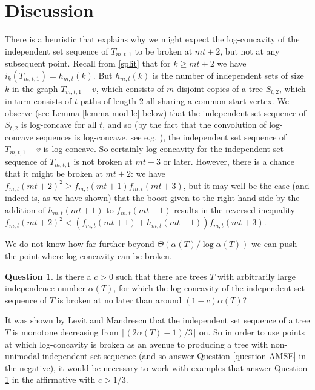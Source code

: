 \documentclass[12pt]{article}
\theoremstyle{definition}
\theoremstyle{definition}
\theoremstyle{definition}
\newtheorem{question}[thm]{Question}
\theoremstyle{definition}
\theoremstyle{definition}
\theoremstyle{definition}
\theoremstyle{definition}
\theoremstyle{definition}
\theoremstyle{remark}
\begin{document}
\section{Discussion} \label{sec-discussion}

There is a heuristic that explains why we might expect the log-concavity of the independent set sequence of $T_{m,t,1}$ to be broken at $mt+2$, but not at any subsequent point. Recall from \eqref{split} that for $k \geq mt+2$ we have $i_k(T_{m,t,1})=h_{m,t}(k)$. But $h_{m,t}(k)$ is the number of independent sets of size $k$ in the graph $T_{m,t,1}-v$, which consists of $m$ disjoint copies of a tree $S_{t,2}$, which in turn consists of $t$ paths of length $2$ all sharing a common start vertex. We observe (see Lemma \ref{lemma-mod-lc} below) that the independent set sequence of $S_{t,2}$ is log-concave for all $t$, and so (by the fact that the convolution of log-concave sequences is log-concave, see e.g. \cite{B2016}), the independent set sequence of $T_{m,t,1}-v$ is log-concave. So certainly log-concavity for the independent set sequence of $T_{m,t,1}$ is not broken at $mt+3$ or later. However, there is a chance that it might be broken at $mt+2$: we have $f_{m,t}(mt+2)^2 \geq f_{m,t}(mt+1)f_{m,t}(mt+3)$, but it may well be the case (and indeed is, as we have shown) that the boost given to the right-hand side by the addition of $h_{m,t}(mt+1)$ to $f_{m,t}(mt+1)$ results in the reversed inequality $f_{m,t}(mt+2)^2 < \left(f_{m,t}(mt+1)+h_{m,t}(mt+1)\right)f_{m,t}(mt+3)$.

\medskip

We do not know how far further beyond $\Theta\left(\alpha(T)/\log \alpha(T)\right)$ we can push the point where log-concavity can be broken.

\begin{question} \label{q-dist}
Is there a $c>0$ such that there are trees $T$ with arbitrarily large independence number $\alpha(T)$, for which the log-concavity of the independent set sequence of $T$ is broken at no later than around $(1-c)\alpha(T)$?
\end{question}
It was shown by Levit and Mandrescu \cite{LM2006} that the independent set sequence of a tree $T$ is monotone decreasing from $\lceil (2\alpha(T)-1)/3\rceil$ on. So in order to use points at which log-concavity is broken as an avenue to producing a tree with non-unimodal independent set sequence (and so answer Question \ref{question-AMSE} in the negative), it would be necessary to work with examples that answer Question \ref{q-dist} in the affirmative with $c > 1/3$.   
\end{document}
